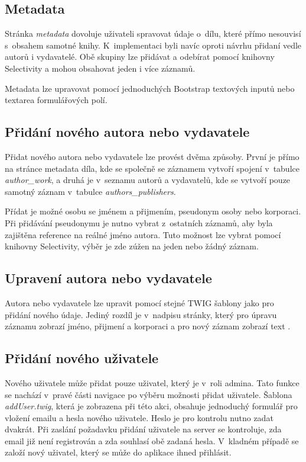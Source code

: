         \subsection{Metadata}
            Stránka \textit{metadata} dovoluje uživateli spravovat údaje o~dílu, které přímo nesouvisí s~obsahem samotné knihy. K~implementaci byli navíc oproti návrhu přidaní vedle autorů i vydavatelé. Obě skupiny lze přidávat a odebírat pomocí knihovny Selectivity a mohou obsahovat jeden i více záznamů.
            
            Metadata lze upravovat pomocí jednoduchých Bootstrap textových inputů nebo textarea formulářových polí.
            
        \subsection{Přidání nového autora nebo vydavatele}
            Přidat nového autora nebo vydavatele lze provést dvěma způsoby. První je přímo na stránce metadata díla, kde se společně se záznamem vytvoří spojení v~tabulce \textit{author\_work}, a druhá je v~seznamu autorů a vydavatelů, kde se vytvoří pouze samotný záznam v~tabulce \textit{authors\_publishers}.
            
            Přídat je možné osobu se jménem a přijmením, pseudonym osoby nebo korporaci. Při přidávání pseudonymu je nutno vybrat z~ostatních záznamů, aby byla zajištěna reference na reálné jméno autora. Tuto možnost lze vybrat pomocí knihovny Selectivity, výběr je zde zúžen na jeden nebo žádný záznam.
        
        \subsection{Upravení autora nebo vydavatele}
            Autora nebo vydavatele lze upravit pomocí stejné TWIG šablony jako pro přidání nového údaje. Jediný rozdíl je v~nadpisu stránky, který pro úpravu záznamu zobrazí jméno, přijmení a korporaci a pro nový záznam zobrazí text .

        \subsection{Přidání nového uživatele}
            Nového uživatele může přidat pouze uživatel, který je v~roli admina. Tato funkce se nachází v~pravé části navigace po výběru možnosti přidat uživatele. Šablona \textit{addUser.twig}, která je zobrazena při této akci, obsahuje jednoduchý formulář pro vložení emailu a hesla nového uživatele. Heslo je pro kontrolu nutno zadat dvakrát. Při zaslání požadavku přidání uživatele na server se kontroluje, zda email již není registrován a zda souhlasí obě zadaná hesla. V~kladném případě se založí nový uživatel, který se může do aplikace ihned přihlásit.
        

